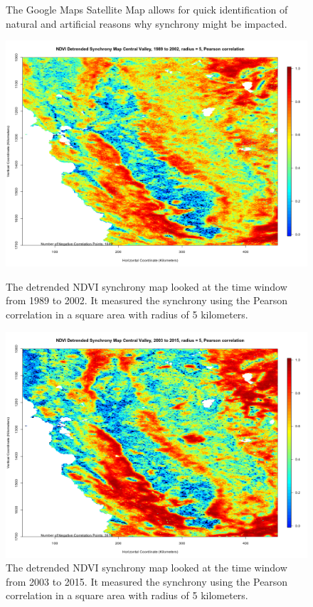 \documentclass[11pt,reqno, twoside]{amsart}
\theoremstyle{plain}  %
\theoremstyle{definition}
\numberwithin{figure}{section}
\numberwithin{equation}{section}
\begin{document}
\begin{figure}[ht]
\begin{minipage}[b]{0.5\linewidth}
    \caption{The Google Maps Satellite Map allows for quick identification of natural and artificial reasons why synchrony might be impacted.} 
    \vspace{4ex}
  \end{minipage} 
  \begin{minipage}[b]{0.5\linewidth}
    \centering
    \includegraphics[width=1\linewidth]{images/NDVIDetrendedSynchronyMap_CentralValley_1989to2002_r5_Pearson.png} 
    \caption{The detrended NDVI synchrony map looked at the time window from 1989 to 2002. It measured the synchrony using the Pearson correlation in a square area with radius of 5 kilometers.} 
    \vspace{4ex}
  \end{minipage}%
  \begin{minipage}[b]{0.5\linewidth}
    \centering
    \includegraphics[width=1\linewidth]{images/NDVIDetrendedSynchronyMap_CentralValley_2003to2015_r5_Pearson.png} 
    \caption{The detrended NDVI synchrony map looked at the time window from 2003 to 2015. It measured the synchrony using the Pearson correlation in a square area with radius of 5 kilometers.} 
    \vspace{4ex}
  \end{minipage} 
\end{figure}
\end{document}
